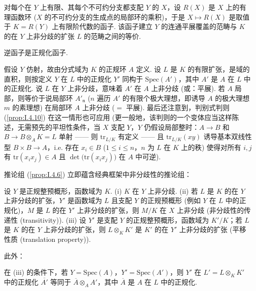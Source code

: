 \begin{corollary}\label{cor:I.10.3}
对每个在 $Y$ 上有限、其每个不可约分支都支配 $Y$ 的 $X$，设 $R(X)$ 是 $X$ 上的有理函数环 ($X$ 的不可约分支的生成点的局部环的乘积)，于是 $X \mapsto R(X)$ 是取值于 $K = R(Y)$ 上有限阶代数的函子. 该函子建立 $Y$ 的连通平展覆盖的范畴与 $K$ 的在 $Y$ 上非分歧的扩张 $L$ 的范畴之间的等价.
\end{corollary}

逆函子是正规化函子.

假设 $Y$ 仿射，故由分式域为 $K$ 的正规环 $A$ 定义. 设 $L$ 是 $K$ 的有限扩张，是域的直积，则按定义 $Y$ 在 $L$ 中的正规化 $Y'$ 同构于 $\mathrm{Spec}(A')$，其中 $A'$ 是 $A$ 在 $L$ 中的正规化. 说 $L$ 在 $Y$ 上非分歧，意味着 $A'$ 在 $A$ 上非分歧 (或：平展). 若 $A$ 局部，则等价于说局部环 $A'_{\mathfrak{n}}$ ($n$ 遍历 $A'$ 的有限个极大理想，即诱导 $A$ 的极大理想 $m$ 的素理想) 在局部环 $A$ 上非分歧 ($=$ 平展). 最后还注意到，判别式判则 (\cref{prop:I.4.10}) 在这一情形也可应用 (更一般地，该判则的一个变体应当这样陈述，无需预先的平坦性条件，当 $X$ 支配 $Y$，$Y$ 仍假设局部整时：$A \to B$ 和 $B \to B \otimes_A K = L$ 单射 —— 则 $\mathrm{tr}_{L/K}$ 有定义 —— 且 $\mathrm{tr}_{L/K}(xy)$ 诱导基本双线性型 $B \times B \to A$，i.e. 存在 $x_i \in B$ ($1 \leqslant i \leqslant n$，$n$ 为 $L$ 在 $K$ 上的秩) 使得对所有 $i, j$ 有 $\mathrm{tr}(x_i x_j) \in A$ 且 $\det\bigl(\mathrm{tr}(x_i x_j)\bigr)$ 在 $A$ 中可逆).

推论组 (\cref{prop:I.4.6}) 立即蕴含经典框架中非分歧性的推论组：

\begin{proposition}\label{prop:I.10.4}
设 $Y$ 是正规整预概形，函数域为 $K$. (i) $K$ 在 $Y$ 上非分歧. (ii) 若 $L$ 是 $K$ 的在 $Y$ 上非分歧的扩张，$Y'$ 是函数域为 $L$ 且支配 $Y$ 的正规预概形 (例如 $Y$ 在 $L$ 中的正规化)，$M$ 是 $L$ 的在 $Y'$ 上非分歧的扩张，则 $M/K$ 在 $X$ 上非分歧 (非分歧性的传递性 (transitivity)). (iii) 设 $Y'$ 是支配 $Y$ 的正规整预概形，函数域为 $K'/K$；若 $L$ 是 $K$ 的在 $Y$ 上非分歧的扩张，则 $L \otimes_K K'$ 是 $K'$ 的在 $Y'$ 上非分歧的扩张 (平移性质 (translation property)).
\end{proposition}

此外：

\begin{corollary}\label{cor:I.10.5}
在 (iii) 的条件下，若 $Y = \mathrm{Spec}(A)$，$Y' = \mathrm{Spec}(A')$，则 $Y'$ 在 $L' = L \otimes_K K'$ 中的正规化 $\overline{A'}$ 等同于 $\overline{A} \otimes_A A'$，其中 $\overline{A}$ 是 $A$ 在 $L$ 中的正规化.
\end{corollary}


